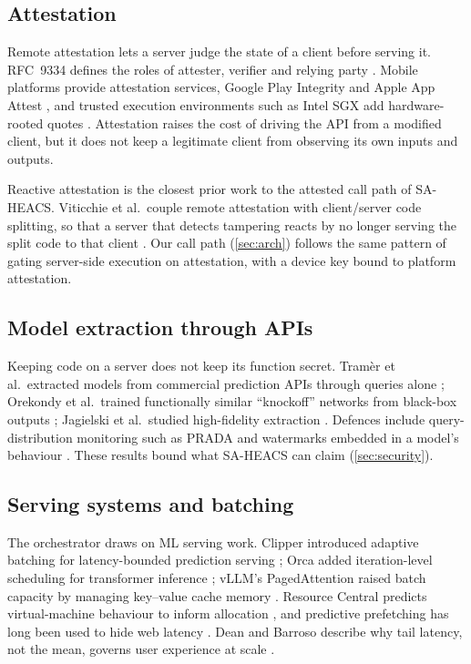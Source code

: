 \subsection{Attestation}
Remote attestation lets a server judge the state of a client before serving it. RFC~9334
defines the roles of attester, verifier and relying party \cite{rfc9334}. Mobile platforms
provide attestation services, Google Play Integrity \cite{google_playintegrity} and Apple
App Attest \cite{apple_appattest}, and trusted execution environments such as Intel SGX add
hardware-rooted quotes \cite{costan2016sgx}. Attestation raises the cost of driving the API
from a modified client, but it does not keep a legitimate client from observing its own
inputs and outputs.

Reactive attestation is the closest prior work to the attested call path of SA-HEACS.
Viticchie et al.\ couple remote attestation with client/server code splitting, so that a
server that detects tampering reacts by no longer serving the split code to that client
\cite{viticchie2016reactive}. Our call path (\cref{sec:arch}) follows the same pattern of
gating server-side execution on attestation, with a device key bound to platform
attestation.

\subsection{Model extraction through APIs}
Keeping code on a server does not keep its function secret. Tramèr et al.\ extracted models
from commercial prediction APIs through queries alone \cite{tramer2016stealing}; Orekondy et
al.\ trained functionally similar \enquote{knockoff} networks from black-box outputs
\cite{orekondy2019knockoff}; Jagielski et al.\ studied high-fidelity extraction
\cite{jagielski2020extraction}. Defences include query-distribution monitoring such as
PRADA \cite{juuti2019prada} and watermarks embedded in a model's behaviour
\cite{adi2018watermarking}. These results bound what SA-HEACS can claim (\cref{sec:security}).

\subsection{Serving systems and batching}
The orchestrator draws on ML serving work. Clipper introduced adaptive batching for
latency-bounded prediction serving \cite{crankshaw2017clipper}; Orca added iteration-level
scheduling for transformer inference \cite{yu2022orca}; vLLM's PagedAttention raised batch
capacity by managing key--value cache memory \cite{kwon2023vllm}. Resource Central predicts
virtual-machine behaviour to inform allocation \cite{cortez2017resourcecentral}, and
predictive prefetching has long been used to hide web latency
\cite{padmanabhan1996prefetching}. Dean and Barroso describe why tail latency, not the mean,
governs user experience at scale \cite{dean2013tail}.

